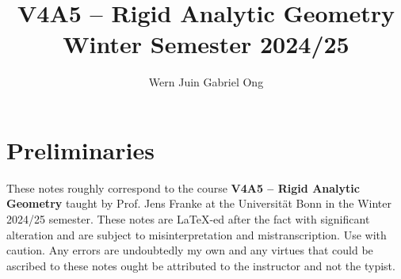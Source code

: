 \documentclass{amsart}
\theoremstyle{definition}
\numberwithin{equation}{section}
\begin{document}
\large
\title[Rigid Analytic Geometry]{V4A5 -- Rigid Analytic Geometry \\ Winter Semester 2024/25}
\author{Wern Juin Gabriel Ong}
\address{Universit\"{a}t Bonn, Bonn, D-53111}
\maketitle
\section*{Preliminaries}
These notes roughly correspond to the course \textbf{V4A5 -- Rigid Analytic Geometry} taught by Prof. Jens Franke at the Universit\"{a}t Bonn in the Winter 2024/25 semester. These notes are \LaTeX-ed after the fact with significant alteration and are subject to misinterpretation and mistranscription. Use with caution. Any errors are undoubtedly my own and any virtues that could be ascribed to these notes ought be attributed to the instructor and not the typist. 
\tableofcontents

\newpage
\printbibliography
\end{document}
